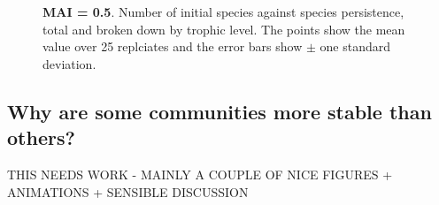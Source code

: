 \begin{figure}
	\centering	
	\renewcommand{\thesubfigure}{}
	\setlength{\subfloatlabelskip}{0pt}
	\caption{\textbf{MAI = 0.5}. Number of initial species against species persistence, total and broken down by trophic level. The points show the mean value over 25 replciates and the error bars show $\pm$ one standard deviation.}
	\label{fig:nsp_v_comp_mai05}
\end{figure}

\newpage
\subsection{Why are some communities more stable than others?}

THIS NEEDS WORK - MAINLY A COUPLE OF NICE FIGURES + ANIMATIONS + SENSIBLE DISCUSSION


